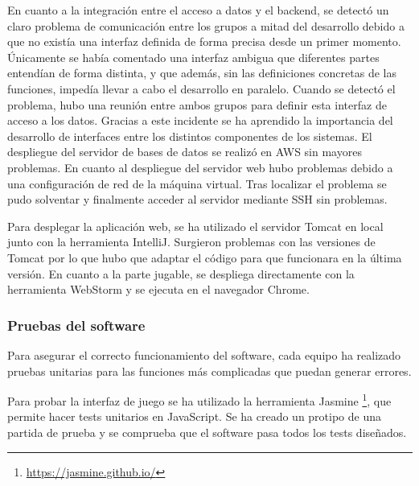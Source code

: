En cuanto a la integración entre el acceso a datos y el backend, se detectó un claro problema de comunicación entre los grupos a mitad del desarrollo debido a que no existía una interfaz definida de forma precisa desde un primer momento. Únicamente se había comentado una interfaz ambigua que diferentes partes entendían de forma distinta, y que además, sin las definiciones concretas de las funciones, impedía llevar a cabo el desarrollo en paralelo. Cuando se detectó el problema, hubo una reunión entre ambos grupos para definir esta interfaz de acceso a los datos. Gracias a este incidente se ha aprendido la importancia del desarrollo de interfaces entre los distintos componentes de los sistemas.
El despliegue del servidor de bases de datos se realizó en AWS sin mayores problemas. En cuanto al despliegue del servidor web hubo problemas debido a una configuración de red de la máquina virtual. Tras localizar el problema se pudo solventar y finalmente acceder al servidor mediante SSH sin problemas.

Para desplegar la aplicación web, se ha utilizado el servidor Tomcat en local junto con la herramienta IntelliJ. Surgieron problemas con las versiones de Tomcat por lo que hubo que adaptar el código para que funcionara en la última versión. En cuanto a la parte jugable, se despliega directamente con la herramienta WebStorm y se ejecuta en el navegador Chrome.

\subsubsection{Pruebas del software}
Para asegurar el correcto funcionamiento del software, cada equipo ha realizado pruebas unitarias para las funciones más complicadas que puedan generar errores.

Para probar la interfaz de juego se ha utilizado la herramienta Jasmine \footnote{ \url{https://jasmine.github.io/} }, que permite hacer tests unitarios en JavaScript. Se ha creado un protipo de una partida de prueba y se comprueba que el software pasa todos los tests diseñados.

